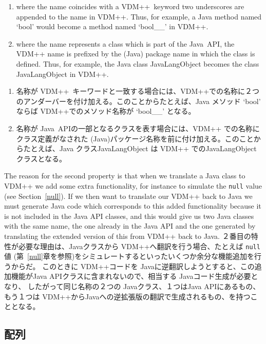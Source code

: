 \documentclass[\pformat,12pt]{jarticle}
\newcommand{\JAVA}{Java}
\newcommand{\VDM}{VDM++}
\begin{document}
\begin{enumerate}
\item where the name coincides with a \VDM\ keyword two underscores
  are appended to the name in \VDM. Thus, for example, a Java method
  named `bool' would become a method named `bool\_\_' in VDM++. 
\item where the name represents a class which is part of the \JAVA\
  API, the VDM++ name is prefixed by the (Java) package name in which
  the class is defined. Thus, for example, the Java class JavaLangObject
  becomes the class JavaLangObject in VDM++. 
\end{enumerate}
\begin{enumerate}
\item 名称が \VDM\ キーワードと一致する場合には、\VDM での名称に２つのアンダーバーを付け加える。このことからたとえば、Java メソッド `bool' ならば VDM++でのメソッド名称が `bool\_\_' となる。
\item 名称が \JAVA\ APIの一部となるクラスを表す場合には、VDM++ での名称にクラス定義がなされた (Java)パッケージ名称を前に付け加える。このことからたとえば、Java クラスJavaLangObject は VDM++ でのJavaLangObjectクラスとなる。
\end{enumerate}

The reason for the second property is that when we translate a Java
class to VDM++ we add some extra functionality, for instance to
simulate the \texttt{null} value (see Section~\ref{null}). If we then
want to translate our VDM++ back to Java we must generate Java code
which corresponds to this added functionality because it is not
included in the Java API classes, and this would give us two Java
classes with the same name, the one already in the Java API and the
one generated by translating the extended version of this from VDM++
back to Java.  
２番目の特性が必要な理由は、Javaクラスから VDM++へ翻訳を行う場合、たとえば \texttt{null} 値 (第~\ref{null}章を参照)をシミュレートするといったいくつか余分な機能追加を行うからだ。
このときに VDM++コードを Javaに逆翻訳しようとすると、この追加機能がJava APIクラスに含まれないので、相当する Javaコード生成が必要となり、 したがって同じ名称の２つの Javaクラス、１つはJava APIにあるもの、もう１つは VDM++からJavaへの逆拡張版の翻訳で生成されるもの、を持つこととなる。

\subsection{配列}\label{arrays}
\end{document}
